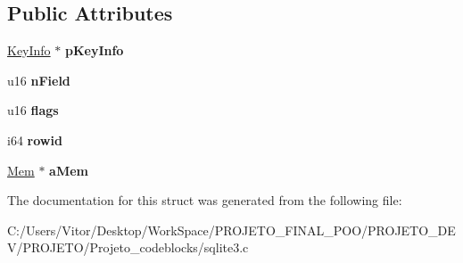 \subsection*{Public Attributes}
\begin{DoxyCompactItemize}
\item 
\hypertarget{struct_unpacked_record_aeb43e7a1e300857cab2cbe98eacd575b}{\hyperlink{struct_key_info}{Key\-Info} $\ast$ {\bfseries p\-Key\-Info}}\label{struct_unpacked_record_aeb43e7a1e300857cab2cbe98eacd575b}

\item 
\hypertarget{struct_unpacked_record_a2c5062735cdbc5039679d255cc900668}{u16 {\bfseries n\-Field}}\label{struct_unpacked_record_a2c5062735cdbc5039679d255cc900668}

\item 
\hypertarget{struct_unpacked_record_a133514faed51f2eda9a26b838fe2c21d}{u16 {\bfseries flags}}\label{struct_unpacked_record_a133514faed51f2eda9a26b838fe2c21d}

\item 
\hypertarget{struct_unpacked_record_a5ec2064b28fcf43b46bf92a515e9203e}{i64 {\bfseries rowid}}\label{struct_unpacked_record_a5ec2064b28fcf43b46bf92a515e9203e}

\item 
\hypertarget{struct_unpacked_record_a3299c322ceb8b758dacc59701021ae9f}{\hyperlink{struct_mem}{Mem} $\ast$ {\bfseries a\-Mem}}\label{struct_unpacked_record_a3299c322ceb8b758dacc59701021ae9f}

\end{DoxyCompactItemize}


The documentation for this struct was generated from the following file\-:\begin{DoxyCompactItemize}
\item 
C\-:/\-Users/\-Vitor/\-Desktop/\-Work\-Space/\-P\-R\-O\-J\-E\-T\-O\-\_\-\-F\-I\-N\-A\-L\-\_\-\-P\-O\-O/\-P\-R\-O\-J\-E\-T\-O\-\_\-\-D\-E\-V/\-P\-R\-O\-J\-E\-T\-O/\-Projeto\-\_\-codeblocks/sqlite3.\-c\end{DoxyCompactItemize}
